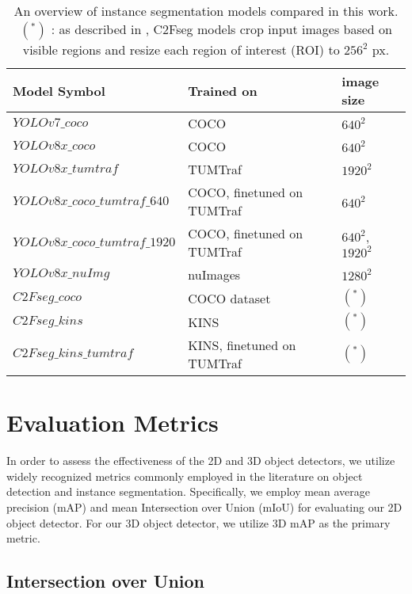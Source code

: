 \begin{table}[htb]%
	\centering%
	\begin{tabular}{lll}
		\toprule
		\textbf{Model Symbol} & \textbf{Trained on} & \textbf{image size}  \\
		\midrule
		$YOLOv7\_coco$ & COCO  & $640^2$  \\
		$YOLOv8x\_coco$ & COCO  & $640^2$ \\
		$YOLOv8x\_tumtraf$ & TUMTraf  & $1920^2$  \\
		$YOLOv8x\_coco\_tumtraf\_640$ & COCO, finetuned on TUMTraf  & $640^2$ \\
		$YOLOv8x\_coco\_tumtraf\_1920$  & COCO, finetuned on TUMTraf  & $640^2$, $1920^2$ \\
		$YOLOv8x\_nuImg$  & nuImages & $1280^2$\\ 
		\cmidrule(lr){1-3} %
		$C2Fseg\_coco$  & COCO dataset &  $(^*)$ \\
		$C2Fseg\_kins$  & KINS  &   $(^*)$ \\
		$C2Fseg\_kins\_tumtraf$ & KINS, finetuned on TUMTraf  &  $(^*)$ \\ 
		\bottomrule
	\end{tabular}
	\caption{An overview of instance segmentation models compared in this work. $(^*)$ : as described in , C2Fseg models crop input images based on visible regions and resize each region of interest (ROI) to $256^2$ px.}
	\label{tab:ISmodels}%
\end{table}

\section{Evaluation Metrics} \label{sec:evaluation metrics}

In order to assess the effectiveness of the 2D and 3D object detectors, we utilize widely recognized metrics commonly employed in the literature on object detection and instance segmentation. Specifically, we employ mean average precision (mAP) and mean Intersection over Union (mIoU) for evaluating our 2D object detector. For our 3D object detector, we utilize 3D mAP as the primary metric.

\subsection{Intersection over Union}

